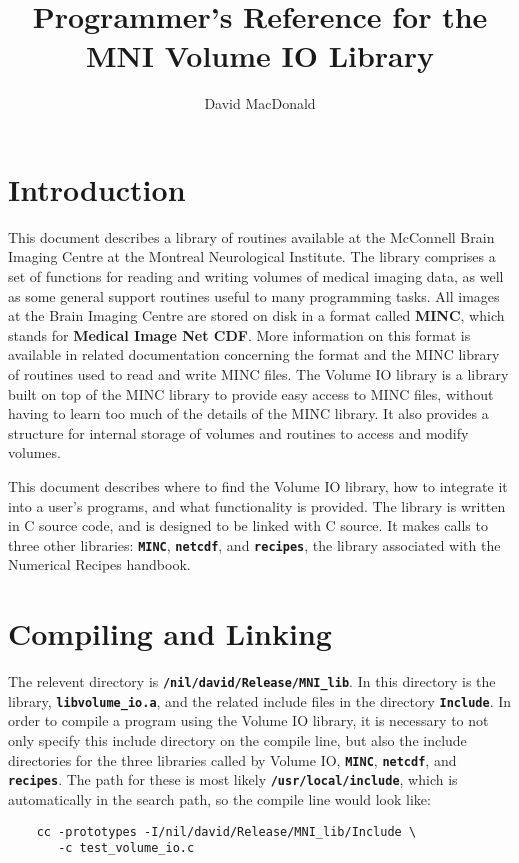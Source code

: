 
\title{Programmer's Reference for the MNI Volume IO Library}
\author{David MacDonald}

\newcommand{\path}{{\bf\tt /nil/david/Release/MNI\_lib}}
\newcommand{\name}[1]{{\bf\tt #1}}



\maketitle

\newpage

\tableofcontents

\newpage

\section{Introduction}

This document describes a library of routines available at the
McConnell Brain Imaging Centre at the Montreal Neurological Institute.
The library comprises a set of functions for reading and writing
volumes of medical imaging data, as well as some general support
routines useful to many programming tasks.  All images at the Brain
Imaging Centre are stored on disk in a format called {\bf MINC}, which
stands for {\bf Medical Image Net CDF}.  More information on this
format is available in related documentation concerning the format and
the MINC library of routines used to read and write MINC files.  The
Volume IO library is a library built on top of the MINC library to
provide easy access to MINC files, without having to learn too much of
the details of the MINC library.  It also provides a structure for internal
storage of volumes and routines to access and modify volumes.

This document describes where to find the Volume IO library, how to
integrate it into a user's programs, and what functionality
is provided.  The library is written in C source code, and is designed
to be linked with C source.  It makes calls to three other libraries:
\name{MINC}, \name{netcdf}, and \name{recipes}, the library associated
with the Numerical Recipes handbook.

\section{Compiling and Linking}

The relevent directory is \path.  In this directory is the library,
\name{libvolume\_io.a}, and the related include files in the directory
\name{Include}.  In order to compile a program using the Volume IO
library, it is necessary to not only specify this include directory on
the compile line, but also the include directories for the three
libraries called by Volume IO, \name{MINC}, \name{netcdf}, and
\name{recipes}.  The path for these is most likely \name{/usr/local/include},
which is automatically in the search path, so the compile line would look like:
\begin{verbatim}
    cc -prototypes -I/nil/david/Release/MNI_lib/Include \
       -c test_volume_io.c
\end{verbatim}

